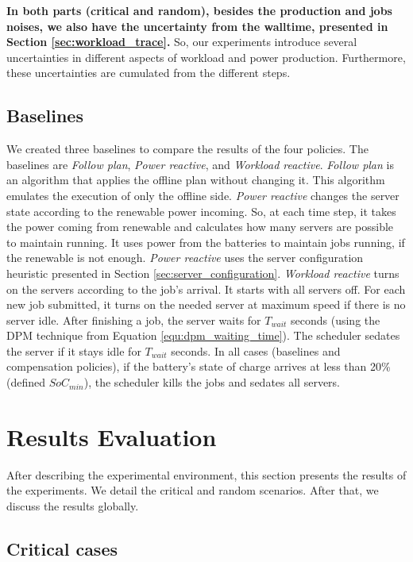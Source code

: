 \textbf{In both parts (critical and random), besides the production and jobs noises, we also have the uncertainty from the walltime, presented in Section \ref{sec:workload_trace}.} So, our experiments introduce several uncertainties in different aspects of workload and power production. Furthermore, these uncertainties are cumulated from the different steps.

\subsection{Baselines}
We created three baselines to compare the results of the four policies. The baselines are \emph{Follow plan}, \emph{Power reactive}, and \emph{Workload reactive}. \emph{Follow plan} is an algorithm that applies the offline plan without changing it. This algorithm emulates the execution of only the offline side. \emph{Power reactive} changes the server state according to the renewable power incoming. So, at each time step, it takes the power coming from renewable and calculates how many servers are possible to maintain running. It uses power from the batteries to maintain jobs running, if the renewable is not enough. \emph{Power reactive} uses the server configuration heuristic presented in Section \ref{sec:server_configuration}. \emph{Workload reactive} turns on the servers according to the job's arrival. It starts with all servers off. For each new job submitted, it turns on the needed server at maximum speed if there is no server idle. After finishing a job, the server waits for $T_{wait}$ seconds (using the DPM technique from Equation \ref{equ:dpm_waiting_time}). The scheduler sedates the server if it stays idle for $T_{wait}$ seconds. In all cases (baselines and compensation policies), if the battery's state of charge arrives at less than 20\% (defined $SoC_{min}$), the scheduler kills the jobs and sedates all servers. 

\section{Results Evaluation}

After describing the experimental environment, this section presents the results of the experiments. We detail the critical and random scenarios. After that, we discuss the results globally.

\subsection{Critical cases}


